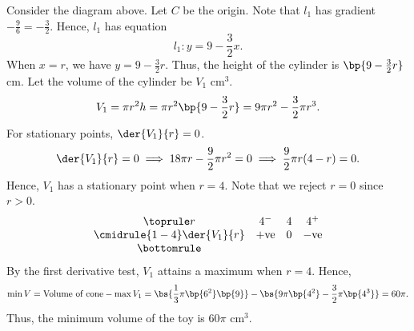 \begin{solution}
    \begin{center}
    \end{center}

    Consider the diagram above. Let $C$ be the origin. Note that $l_1$ has gradient $-\frac96 = -\frac32$. Hence, $l_1$ has equation \[l_1: y = 9 - \frac32 x.\] When $x = r$, we have $y = 9 - \frac32 r$. Thus, the height of the cylinder is $\bp{9 - \frac32 r}$ cm. Let the volume of the cylinder be $V_1$ cm$^3$. \[V_1 = \pi r^2 h = \pi r^2 \bp{9 - \frac32 r} = 9\pi r^2 - \frac32 \pi r^3.\] For stationary points, $\der{V_1}{r} = 0$. \[\der{V_1}{r} = 0 \implies 18\pi r - \frac92 \pi r^2 = 0 \implies \frac92 \pi r (4 - r) = 0.\] Hence, $V_1$ has a stationary point when $r = 4$. Note that we reject $r = 0$ since $r > 0$.
    \[
    \begin{array}{c c c c}\toprule
        r & 4^- & 4 & 4^+ \\\cmidrule{1-4}
        \der{V_1}{r} & +\text{ve} & 0 & -\text{ve}\\\bottomrule
    \end{array}
    \]
    By the first derivative test, $V_1$ attains a maximum when $r = 4$. Hence, \[\min V = \text{Volume of cone} - \max V_1 = \bs{\frac13 \pi \bp{6^2}\bp{9}} - \bs{9\pi \bp{4^2} - \frac32 \pi \bp{4^3}} = 60\pi.\] Thus, the minimum volume of the toy is $60\pi$ cm$^3$.
\end{solution}

